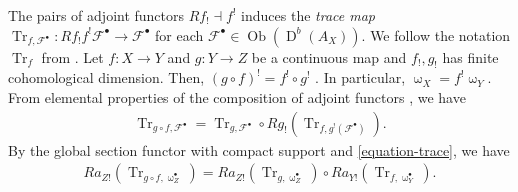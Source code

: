 \documentclass[a4paper,dvipdfmx,reqno,12pt]{amsart}
\theoremstyle{definition}
\newcommand{\opn}[1]{\operatorname{#1}}
\numberwithin{equation}{section}
\begin{document}
The pairs of adjoint functors $Rf_! \dashv f^{!}$ 
induces the \emph{trace map} $\opn{Tr}_{f,\mathcal{F}^{\bullet}}\colon Rf_!f^{!}\mathcal{F}^{\bullet}
\to \mathcal{F}^{\bullet}$ for each 
$\mathcal{F}^{\bullet}\in \opn{Ob}(\opn{D}^{b}(A_X))$.
We follow the notation $\opn{Tr}_f$ from 
\cite[p.20]{MR1299726}.
Let $f\colon X\to Y $ and $g\colon Y\to Z$ be 
a continuous map and $f_!,g_!$ has finite cohomological 
dimension. Then, $(g\circ f)^{!}=f^{!}\circ g^{!}$
\cite[Proposition 3.1.8]{MR1299726}.
In particular, $\upomega_X=f^{!}\upomega_Y$.
From elemental properties of the composition of
adjoint functors \cite[p.103]{MR1712872}, we have
\begin{align}
\label{equation-trace}
\opn{Tr}_{g\circ f,\mathcal{F}^{\bullet}}=
\opn{Tr}_{g,\mathcal{F}^{\bullet}} 
\circ Rg_!(\opn{Tr}_{f,g^{!}(\mathcal{F}^{\bullet})}).
\end{align}
By the global section functor with compact support and
\cref{equation-trace}, we have
\begin{align}
\label{equation-trace-push}
Ra_{Z!}(\opn{Tr}_{g\circ f,\upomega_{Z}^{\bullet}})
=Ra_{Z!}(\opn{Tr}_{g,\upomega_{Z}^{\bullet}})
\circ Ra_{Y!}(\opn{Tr}_{f,\upomega_{Y}^{\bullet}}).
\end{align}










\printindex
\end{document}
